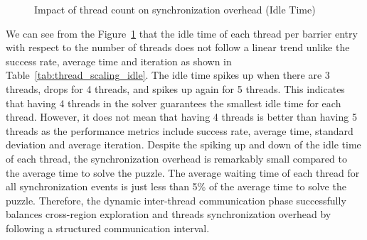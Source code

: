 \begin{figure}[H]
    \centering
    \caption{Impact of thread count on synchronization overhead (Idle Time)}
    \label{fig:idle_time_scaling_graph}
\end{figure}

We can see from the Figure~\ref{fig:idle_time_scaling_graph} that the idle time of each thread per barrier entry with respect to the number of threads does not follow a linear trend unlike the success rate, average time and iteration as shown in Table~\ref{tab:thread_scaling_idle}. The idle time spikes up when there are 3 threads, drops for 4 threads, and spikes up again for 5 threads. This indicates that having 4 threads in the solver guarantees the smallest idle time for each thread. However, it does not mean that having 4 threads is better than having 5 threads as the performance metrics include success rate, average time, standard deviation and average iteration. Despite the spiking up and down of the idle time of each thread, the synchronization overhead is remarkably small compared to the average time to solve the puzzle. The average waiting time of each thread for all synchronization events is just less than 5\% of the average time to solve the puzzle. Therefore, the dynamic inter-thread communication phase successfully balances cross-region exploration and threads synchronization overhead by following a structured communication interval. 

